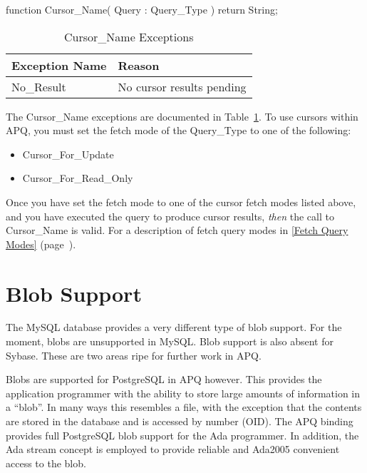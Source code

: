 \documentclass[english,letterpaper]{book}
\newcommand\Ref[1]{\textsection\ref{#1} (page~\pageref{#1})}
\begin{document}
\begin{Code}
function Cursor_Name(
   Query : Query_Type
) return String;
\end{Code}

\begin{table}
   \begin{center}
      \begin{tabular}{ll}
         Exception Name    &  Reason\\
         \hline 
         No\_Result        &  No cursor results pending\\
      \end{tabular}
   \end{center}
   \caption{Cursor\_Name Exceptions}\label{t:cnamx}
\end{table}

The Cursor\_Name exceptions are documented in Table~\ref{t:cnamx}.
To use cursors within APQ, you must set the fetch mode of the Query\_Type
to one of the following:

\begin{itemize}
   \item Cursor\_For\_Update
   \item Cursor\_For\_Read\_Only
\end{itemize}

Once you have set the fetch mode to one of the cursor fetch modes
listed above, and you have executed the query to produce cursor results,
\emph{then} the call to Cursor\_Name is valid. For a description of
fetch query modes in \Ref{Fetch Query Modes}.


\chapter{Blob Support}

The MySQL database provides a very different type of blob support.
For the moment, blobs are unsupported in MySQL. Blob support is also
absent for Sybase. These are two areas ripe for further work in APQ.

Blobs are supported for PostgreSQL in APQ however. This provides the
application programmer with the ability to store large amounts of
information in a ``blob''. In many ways this resembles
a file, with the exception that the contents are stored
in the database and is accessed by number (OID). The APQ
binding provides full PostgreSQL blob support for the Ada programmer.
In addition, the Ada stream concept is employed to
provide reliable and Ada2005 convenient access to the blob.
\end{document}
